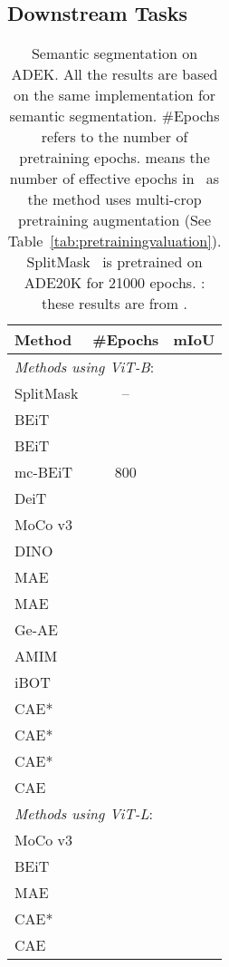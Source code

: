 \documentclass[twocolumn]{svjour3}          \smartqed  \usepackage{graphicx}
\def \ours {CAE*\xspace}
\def \oursdvae {CAE\xspace}
\begin{document}
\subsection{Downstream Tasks}


\begin{table}[t]
    \centering
    \caption{Semantic segmentation on ADEK.
    All the results are based on the same
    implementation
    for semantic segmentation. \#Epochs refers to the number of pretraining epochs.
     means the number of effective epochs in~\cite{zhou2021ibot} as the method uses multi-crop pretraining augmentation (See Table~\ref{tab:pretrainingvaluation}).
    SplitMask~\cite{el2021large} is pretrained on ADE20K for 21000 epochs.
    { 
    : these results are from \cite{he2021masked}.
    }
    } 
    \setlength{\tabcolsep}{23pt}
\renewcommand{\arraystretch}{1.1}
        \begin{tabular}{l c c}
        \toprule
        Method  
        & \#Epochs  & mIoU  \\
         \midrule
      \multicolumn{3}{l}{\emph{Methods using ViT-B}:}\\
        SplitMask & -- &  \\
        BEiT &  &   \\
        BEiT &  &     \\ 
        mc-BEiT & 800 &  \\
        DeiT &  &   \\
        MoCo v3 &  &   \\
        DINO &  &   \\
        MAE &  & \\
        MAE &  &  \\
        Ge-AE &  &  \\
        AMIM &  &  \\
         iBOT &  &  \\
        \ours &  &   \\ 
        \ours &   &   \\
        \ours &  &   \\
        \oursdvae &  &   \\
    \midrule
      \multicolumn{3}{l}{\emph{Methods using ViT-L}:}\\
      MoCo v3 &   & \\
      BEiT &   & \\
      MAE &   & \\
      \ours &   &   \\
      \oursdvae &   &   \\
        \bottomrule     
    \end{tabular} 
    \label{tab:segmentation}
\end{table}
\end{document}
